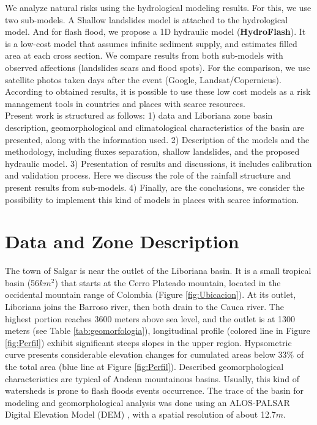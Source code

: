 {We analyze natural risks using the hydrological modeling results. For this, we use two sub-models.  A Shallow landslides model \citep{Aristizabal2016} is attached to the hydrological model. And for flash flood, we propose a 1D hydraulic model (\textbf{HydroFlash}). It is a low-cost model that assumes infinite sediment supply, and estimates filled area at each cross section. We compare results from both sub-models with observed affections (landslides scars and flood spots). For the comparison, we use satellite photos taken days after the event (Google, Landsat/Copernicus).  According to obtained results, it is possible to use these low cost models as a risk management tools in countries and places with scarce resources.\\  

Present work is structured as follows: 1) data and Liboriana zone basin description, geomorphological and climatological characteristics of the basin are presented, along with the information used. 2) Description of the models and the methodology, including fluxes separation, shallow landslides, and the proposed hydraulic model. 3) Presentation of results and discussions, it includes calibration and validation process. Here we discuss the role of the rainfall structure and present results from sub-models. 4) Finally, are the conclusions, we consider the possibility to implement this kind of models in places with scarce information.\\

\section{Data and Zone Description}


The town of Salgar is near the outlet of the Liboriana basin. It is a small tropical basin (56$km^2$) that starts at the Cerro Plateado mountain, located in the occidental mountain range of Colombia (Figure \ref{fig:Ubicacion}). At its outlet, Liboriana joins the Barroso river, then both drain to the Cauca river.  The highest portion reaches 3600 meters above sea level, and the outlet is at 1300 meters (see Table \ref{tab:geomorfologia}), longitudinal profile (colored line in Figure \ref{fig:Perfil}) exhibit significant steeps slopes in the upper region.  Hypsometric curve presents considerable elevation changes for cumulated areas below 33\% of the total area (blue line at Figure \ref{fig:Perfil}).  Described geomorphological characteristics are typical of Andean mountainous basins. Usually, this kind of watersheds is prone to flash floods events occurrence.   The trace of the basin for modeling and geomorphological analysis was done using an ALOS-PALSAR Digital Elevation Model (DEM) \citep{ALOS}, with a spatial resolution of about 12.7$m$.\\

}

